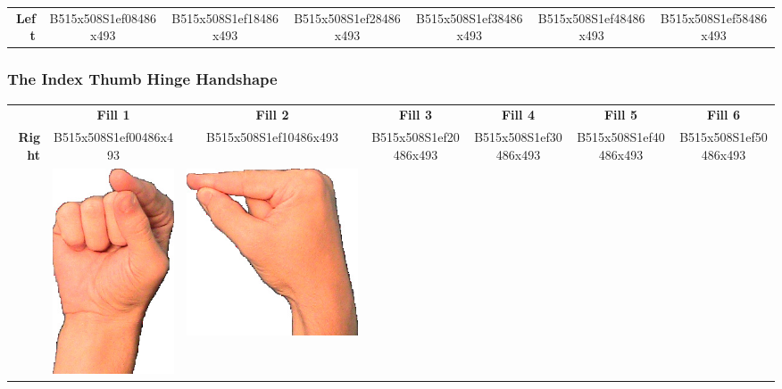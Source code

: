 \documentclass{article}
\begin{document}
\begin{center}
\begin{tabular}{r*{6}{c}}
\textbf{Left}&
B515x508S1ef08486x493&
B515x508S1ef18486x493&
B515x508S1ef28486x493&
B515x508S1ef38486x493&
B515x508S1ef48486x493&
B515x508S1ef58486x493\\
\end{tabular}
\end{center}

\subsubsection{The Index Thumb Hinge Handshape}

\begin{center}
\begin{tabular}{r*{6}{c}}
&\textbf{Fill 1}&\textbf{Fill 2}&\textbf{Fill 3}&\textbf{Fill 4}&\textbf{Fill 5}&\textbf{Fill 6}\\
\multirow{2}{*}{\textbf{Right}}&
B515x508S1ef00486x493&
B515x508S1ef10486x493&
B515x508S1ef20486x493&
B515x508S1ef30486x493&
B515x508S1ef40486x493&
B515x508S1ef50486x493\\
&
\includegraphics[scale=0.1]{images/09-13-1.jpg}&
\includegraphics[scale=0.1]{images/09-13-2.jpg}&

\end{tabular}
\end{center}
\end{document}

